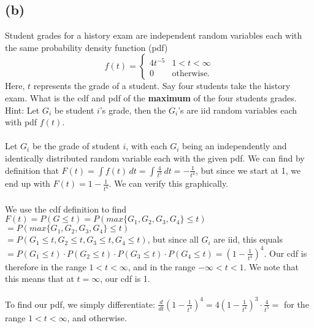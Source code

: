 \documentclass{article}
\begin{document}
{\subsection*{(b)}
Student grades for a history exam are independent random variables each with the same probability density function (pdf)
\[f(t)=\begin{cases}4t^{-5}& 1<t<\infty\\ 0& \text{otherwise.}  \end{cases}\]
Here, $t$ represents the grade of a student.  Say four students  take  the history exam. What is the cdf and pdf  of the {\bf{maximum}} of the four students grades. Hint: Let $G_i$ be student $i$'s grade, then the  $G_i$'s are iid random variables each with pdf $f(t)$. \\ \\ 
Let $G_i$ be the grade of student $i$, with each $G_i$ being an independently and identically distributed random variable each with the given pdf. We can find by definition that $F(t) = \int f(t) \, dt = \int \frac{4}{t^5} \, dt = -\frac{1}{t^4}$, but since we start at 1, we end up with $F(t) = 1 - \frac{1}{t^4}$. We can verify this graphically. \\ \\
We use the cdf definition to find $F(t) = P(G \leq t) = P(max\{G_1, G_2, G_3, G_4\} \leq t) $ \\ 
$ = P(max\{G_1, G_2, G_3, G_4\} \leq t)$ \\
$= P(G_1 \leq t, G_2 \leq t, G_3 \leq t, G_4 \leq t)$, but since all $G_i$ are iid, this equals \\
$= P(G_1 \leq t) \cdot P(G_2 \leq t) \cdot P(G_3 \leq t) \cdot P(G_4 \leq t) = (1-\frac{1}{t^4})^4$. Our cdf is therefore  in the range $1 < t < \infty$, and  in the range $-\infty < t < 1$. We note that this means that at $t = \infty$, our cdf is 1. \\ \\
To find our pdf, we simply differentiate: $\frac{d}{dt} (1-\frac{1}{t^4})^4 = 4(1 - \frac{1}{t^4})^3 \cdot \frac{4}{t^5} = $   for the range $1 < t < \infty$, and  otherwise. \\ 

}
\end{document}
